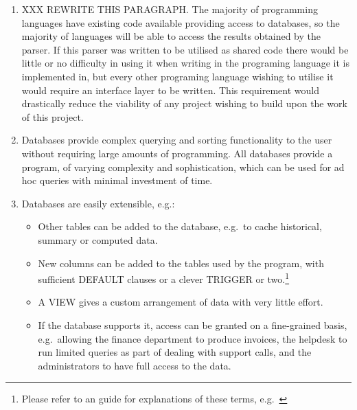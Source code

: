 \begin{enumerate}

    \item XXX REWRITE THIS PARAGRAPH\@.  The majority of programming
        languages have existing code available providing access to
        databases, so the majority of languages will be able to access the
        results obtained by the parser.  If this parser was written to be
        utilised as shared code there would be little or no difficulty in
        using it when writing in the programing language it is implemented
        in, but every other programing language wishing to utilise it would
        require an interface layer to be written.  This requirement would
        drastically reduce the viability of any project wishing to build
        upon the work of this project.

    \item Databases provide complex querying and sorting functionality to
        the user without requiring large amounts of programming.  All
        databases provide a program, of varying complexity and
        sophistication, which can be used for ad hoc queries with minimal
        investment of time.

    \item Databases are easily extensible, e.g.:

        \begin{itemize}

            \item Other tables can be added to the database, e.g.\ to cache
                historical, summary or computed data.

            \item New columns can be added to the tables used by the
                program, with sufficient DEFAULT clauses or a clever
                TRIGGER or two.\footnote{Please refer to an \SQL{} guide
                for explanations of these terms,
                e.g.~\cite{sql-for-web-nerds}}

            \item A VIEW gives a custom arrangement of data with very
                little effort.

            \item If the database supports it, access can be granted on a
                fine-grained basis, e.g.\ allowing the finance department
                to produce invoices, the helpdesk to run limited queries as
                part of dealing with support calls, and the administrators
                to have full access to the data.


\end{itemize}
\end{enumerate}
